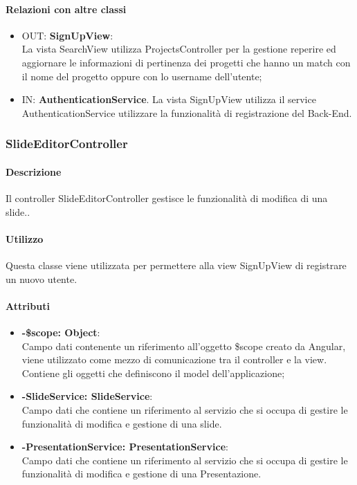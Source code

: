 	\paragraph{Relazioni con altre classi}
	\begin{itemize}
	  \item OUT: \textbf{SignUpView}:\\
		La vista SearchView utilizza ProjectsController per la gestione reperire ed aggiornare le informazioni di pertinenza dei progetti che hanno un match con il nome del progetto oppure con lo username dell'utente;	
	  \item IN: \textbf{AuthenticationService}.
		La vista SignUpView utilizza il service AuthenticationService utilizzare la funzionalità di registrazione del Back-End.	
	\end{itemize}		
	
\subsubsection{SlideEditorController}
	\paragraph{Descrizione}
	Il controller SlideEditorController gestisce le funzionalità di modifica di una slide..
	
	\paragraph{Utilizzo}
	Questa classe viene utilizzata per permettere alla view SignUpView di registrare un nuovo utente.\\
	\paragraph{Attributi}
	\begin{itemize}
		\item \textbf{-\$scope: Object}:\\
			Campo dati contenente un riferimento all'oggetto \$scope creato da Angular, viene utilizzato come mezzo di comunicazione tra il controller e la view. Contiene gli oggetti che definiscono il model dell'applicazione;
		\item \textbf{-SlideService: SlideService}:\\
			Campo dati che contiene un riferimento al servizio che si occupa di gestire le funzionalità di modifica e gestione di una slide.
		\item \textbf{-PresentationService: PresentationService}:\\
			Campo dati che contiene un riferimento al servizio che si occupa di gestire le funzionalità di modifica e gestione di una Presentazione.
	\end{itemize}
	
